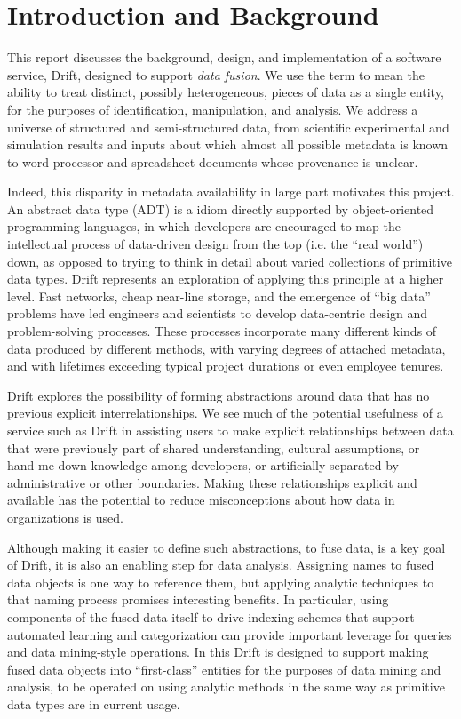 \section{Introduction and Background}

This report discusses the background, design, and implementation of a software service, Drift, designed to
support \emph{data fusion}.  We use the term to mean the ability to treat distinct, possibly
heterogeneous, pieces of data as a single entity, for the purposes of identification, manipulation, and
analysis.  We address a universe of structured and semi-structured data, from scientific experimental and
simulation results and inputs about which almost all possible metadata is known to word-processor and
spreadsheet documents whose provenance is unclear.  

Indeed, this disparity in metadata availability in large part motivates this project.  An abstract data
type (ADT) is a idiom directly supported by object-oriented programming languages, in which developers
are encouraged to map the intellectual process of data-driven design from the top (i.e. the ``real
world'') down, as opposed to trying to think in detail about varied collections of primitive data types.
Drift represents an exploration of applying this principle at a higher level.  Fast networks, cheap
near-line storage, and the emergence of ``big data'' problems have led engineers and
scientists to develop data-centric design and problem-solving processes.  These processes incorporate many different kinds
of data produced by different methods, with varying degrees of attached metadata, and with lifetimes
exceeding typical project durations or even employee tenures.  

Drift explores the possibility of forming abstractions around data that has no previous explicit
interrelationships.  We see much of the potential usefulness of a service such as Drift in assisting
users to make explicit relationships between data that were previously part of shared understanding, 
cultural assumptions, or hand-me-down knowledge among developers, or artificially separated by
administrative or other boundaries.  Making these relationships 
explicit and available has the potential to reduce misconceptions about how data in organizations is
used.  

Although making it easier to define such abstractions, to fuse data, is a key goal of Drift, it is also
an enabling step for data analysis.  Assigning names to fused data objects is one way to reference them,
but applying analytic techniques to that naming process promises interesting benefits.  In particular,
using components of the fused data itself to drive indexing schemes that support automated learning and
categorization can provide important leverage for queries and data mining-style operations.  In this
Drift is designed to support making fused data objects into ``first-class'' entities for the purposes of
data mining and analysis, to be operated on using analytic methods in the same way as primitive data
types are in current usage.


